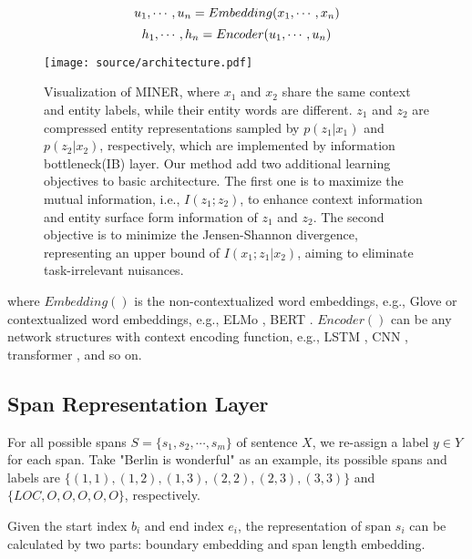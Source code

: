 \documentclass[11pt]{article}
\begin{document}
\begin{equation}
\setlength{\abovedisplayskip}{1pt}
\setlength{\belowdisplayskip}{1pt}
u_1, \cdots, u_n = Embedding(x_1, \cdots, x_n)
\end{equation}
\begin{equation}
\setlength{\abovedisplayskip}{1pt}
\setlength{\belowdisplayskip}{1pt}
h_1, \cdots, h_n = Encoder(u_1, \cdots, u_n)
\end{equation}

\begin{figure*}[t]
\centering
  \texttt{[image: source/architecture.pdf]}
  \caption{Visualization of MINER, where $x_1$ and $x_2$ share the same context and entity labels, while their entity words are different. $z_1$ and $z_2$ are compressed entity representations sampled by $p(z_1|x_1)$ and $p(z_2|x_2)$, respectively, which are implemented by information bottleneck(IB) layer. Our method add two additional learning objectives to basic architecture. The first one is to maximize the mutual information, i.e., $I(z_1;z_2)$, to enhance context information and entity surface form information of $z_1$ and $z_2$. The second objective is to minimize the Jensen-Shannon divergence, representing an upper bound of $I(x_1;z_1|x_2)$, aiming to eliminate task-irrelevant nuisances.}
 \label{fig:trans}
\end{figure*}


where $Embedding()$ is the non-contextualized word embeddings, e.g., Glove \cite{pennington-etal-2014-glove} or contextualized word embeddings, e.g., ELMo \cite{peters-etal-2018-deep}, BERT \cite{devlin2018bert}. $Encoder()$ can be any network structures with context encoding function, e.g., LSTM \cite{hochreiter1997long}, CNN \cite{lecun1995convolutional}, transformer \cite{vaswani2017attention}, and so on. 

\subsection{Span Representation Layer}
For all possible spans $S=\{s_1, s_2,\cdots,s_m\}$ of sentence $X$, we re-assign a label $y\in Y$ for each span. Take "Berlin is wonderful" as an example, its possible spans and labels are $\{(1,1),(1,2),(1,3),(2,2),(2,3),(3,3)\}$ and $\{LOC,O,O,O,O,O\}$, respectively.

Given the start index $b_i$ and end index $e_i$, the representation of span $s_i$ can be calculated by two parts: boundary embedding and span length embedding.
\end{document}
